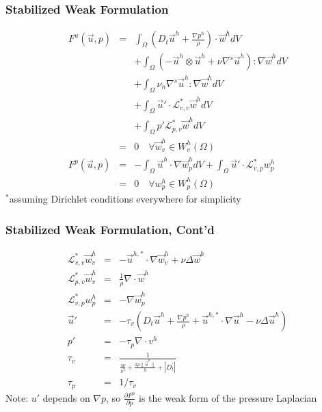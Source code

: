 \begin{frame} 
\frametitle{Stabilized Weak Formulation}
\begin{eqnarray}
  F^u(\vec u, p) &=& \int_{\Omega} \left( D_t \vec u^h + \frac{\nabla p^h}{\rho} \right) \cdot \vec w^h dV  \nonumber \\
&& +  \int_{\Omega} \left( -\vec u^h \otimes \vec u^h + \nu \nabla^s \vec u^h   \right) : \nabla \vec w^h dV  \nonumber \\
&&+\int_{\Omega} \nu_n \nabla^s \vec u^h : \nabla \vec w^h dV \nonumber \\
&&+\int_{\Omega} \vec u' \cdot \mathcal{L}^{*}_{v,v} \vec w^h dV \nonumber \\
&&+\int_{\Omega} p' \mathcal{L}^{*}_{p,v} \vec w^h dV \label{eq:weakmomtdMS}\\
&=& 0  \quad \forall \vec w^h_v \in  W^h_v(\Omega)  \nonumber  \\
F^p(\vec u,p) &=& -\int_{\Omega} \vec u^h \cdot \nabla \vec w_p^h dV + \int_{\Omega} \vec u' \cdot \mathcal{L}^*_{v,p} w_p^h \\
&=& 0 \quad \forall w_p^h \in W_p^h(\Omega) \nonumber  
\end{eqnarray}  
$^*$assuming Dirichlet conditions everywhere for simplicity
\end{frame}
\begin{frame}
\frametitle{Stabilized Weak Formulation, Cont'd}
\begin{eqnarray}
\mathcal{L}^*_{v,v} \vec w^h_v &=&  - \vec u^{h,*} \cdot \nabla \vec w^h_v  + \nu \Delta \vec w^h \\
\mathcal{L}^*_{p,v} \vec w^h_v &=& \frac{1}{\rho} \nabla \cdot \vec w^h \\
\mathcal{L}^*_{v,p} w^h_p &=& -\nabla \vec w^h_p \\
\vec u' &=& - \tau_v \left( D_t \vec u^h + \frac{\nabla p^h}{\rho}  +   \vec u^{h,*} \cdot \nabla \vec u^h - \nu \Delta \vec u^h  \right) \\
p' &=& -\tau_p \nabla \cdot v^h\\
\tau_v &=& \frac{1}{\frac{4 \nu}{h^2} + \frac{2 \rho \|\vec u^h\| }{h} + |D_t^{'}|} \\
\tau_p &=& 1/\tau_v
\end{eqnarray}
Note: $u'$ depends on $\nabla p$, so $\frac{\partial F^p}{\partial p}$ is the weak form of the pressure Laplacian 
\end{frame}
